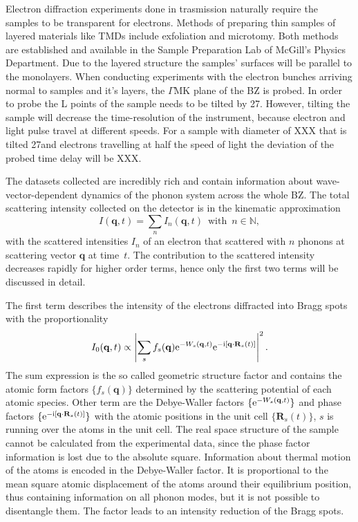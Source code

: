 Electron diffraction experiments done in trasmission naturally require the samples to be transparent for electrons.
Methods of preparing thin samples of layered materials like \acp{TMD} include exfoliation\cite{exf} and microtomy\cite{micro}.
Both methods are established and available in the Sample Preparation Lab of McGill's Physics Department.
Due to the layered structure the samples' surfaces will be parallel to the monolayers.
When conducting experiments with the electron bunches arriving normal to \ts\space samples and it's layers, the $\Gamma\mathrm{MK}$ plane of the \ac{BZ} is probed.
In order to probe the L points of \ts\space the sample needs to be tilted by 27\textdegree.
However, tilting the sample will decrease the time-resolution of the instrument, because electron and light pulse travel at different speeds.
For a sample with diameter of XXX that is tilted 27\textdegree and electrons travelling at half the speed of light the deviation of the probed time delay will be XXX.

The datasets collected are incredibly rich and contain information about wave-vector-dependent dynamics of the phonon system across the whole \ac{BZ}.
The total scattering intensity collected on the detector is in the kinematic approximation
\begin{equation} I(\mathbf{q},t) = \sum_n I_n(\mathbf{q},t)\enspace\text{with}\enspace n \in\mathbb{N},\label{eq:I}\end{equation}
with the scattered intensities $I_n$ of an electron that scattered with $n$ phonons at scattering vector $\mathbf{q}$ at time~$t$.
The contribution to the scattered intensity decreases rapidly for higher order terms, hence only the first two terms will be discussed in detail.

The first term describes the intensity of the electrons diffracted into Bragg spots with the proportionality
\begin{equation} I_0(\mathbf{q}, t) \propto \left| \sum_s f_s(\mathbf{q}) \mathrm{e}^{-W_s(\mathbf{q},t)} \mathrm{e}^{-\mathrm{i}[\mathbf{q}\cdot\mathbf{R}_s(t)]} \right| ^2.\label{eq:I0}\end{equation}
The sum expression is the so called geometric structure factor and contains the atomic form factors $\{f_s(\mathbf{q})\}$ determined by the scattering potential of each atomic species. Other term are the Debye-Waller factors $\{\mathrm{e}^{-W_s(\mathbf{q},t)}\}$ and phase factors $\{\mathrm{e}^{-\mathrm{i}[\mathbf{q}\cdot\mathbf{R}_s(t)]}\}$ with the atomic positions in the unit cell $\{\mathbf{R}_s(t)\}$, $s$ is running over the atoms in the unit cell.
The real space structure of the sample cannot be calculated from the experimental data, since the phase factor information is lost due to the absolute square.
Information about thermal motion of the atoms is encoded in the Debye-Waller factor.
It is proportional to the mean square atomic displacement of the atoms around their equilibrium position, thus containing information on all phonon modes, but it is not possible to disentangle them.
The factor leads to an intensity reduction of the Bragg spots.

